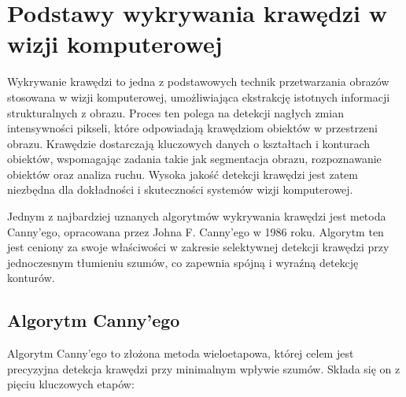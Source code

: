 \section{Podstawy wykrywania krawędzi w wizji komputerowej}
\label{seq:canny}
Wykrywanie krawędzi to jedna z podstawowych technik przetwarzania obrazów stosowana w wizji komputerowej, umożliwiająca ekstrakcję istotnych informacji strukturalnych z obrazu. Proces ten polega na detekcji nagłych zmian intensywności pikseli, które odpowiadają krawędziom obiektów w przestrzeni obrazu. Krawędzie dostarczają kluczowych danych o kształtach i konturach obiektów, wspomagając zadania takie jak segmentacja obrazu, rozpoznawanie obiektów oraz analiza ruchu. Wysoka jakość detekcji krawędzi jest zatem niezbędna dla dokładności i skuteczności systemów wizji komputerowej.

Jednym z najbardziej uznanych algorytmów wykrywania krawędzi jest metoda Canny'ego, opracowana przez Johna F. Canny’ego w 1986 roku. Algorytm ten jest ceniony za swoje właściwości w zakresie selektywnej detekcji krawędzi przy jednoczesnym tłumieniu szumów, co zapewnia spójną i wyraźną detekcję konturów.

\subsection{Algorytm Canny’ego}

Algorytm Canny’ego \cite{bib:canny-article} to złożona metoda wieloetapowa, której celem jest precyzyjna detekcja krawędzi przy minimalnym wpływie szumów. Składa się on z pięciu kluczowych etapów:

